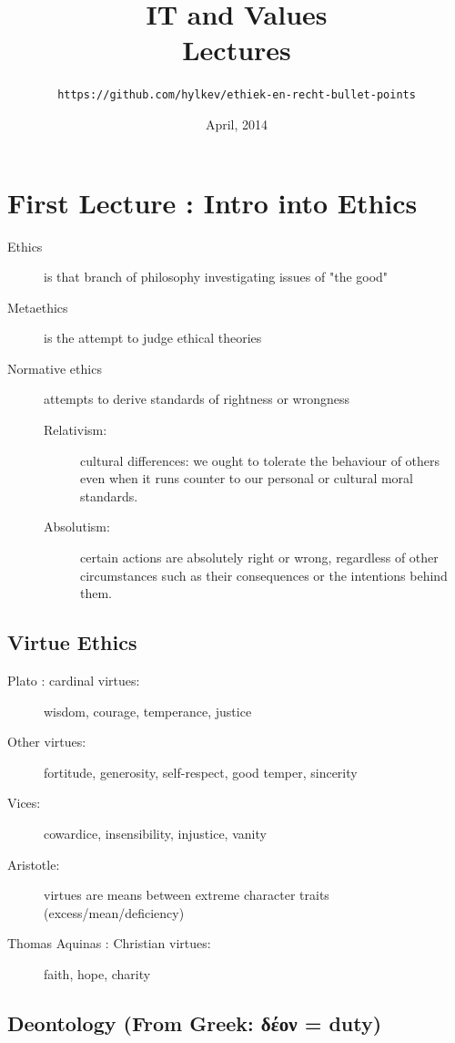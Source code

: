 \documentclass[a4paper]{article}
\begin{document}
\title{\textbf{IT and Values \\ Lectures}}
\author{\texttt{https://github.com/hylkev/ethiek-en-recht-bullet-points}}
\date{April, 2014}
\maketitle

\section{First Lecture : Intro into Ethics}

\begin{description}
\item[Ethics] is that branch of philosophy investigating issues of "the good"
\item[Metaethics] is the attempt to judge ethical theories
\item[Normative ethics] attempts to derive standards of rightness or wrongness
\begin{description}
\item[Relativism:] cultural differences: we ought to tolerate the behaviour of others even when it runs counter to our personal or cultural moral standards.
\item[Absolutism:] certain actions are absolutely right or wrong, regardless of other circumstances such as their consequences or the intentions behind them.
\end{description}
\end{description}

\subsection*{Virtue Ethics}

\begin{description}
\item[Plato : cardinal virtues:] wisdom, courage, temperance, justice
\item[Other virtues:] fortitude, generosity, self-respect, good temper, sincerity
\item[Vices:] cowardice, insensibility, injustice, vanity
\item[Aristotle:] virtues are means between extreme character traits (excess/mean/deficiency)
\item[Thomas Aquinas : Christian virtues:] faith, hope, charity
\end{description}

\subsection*{Deontology (From Greek: δέον = duty)}
\end{document}
